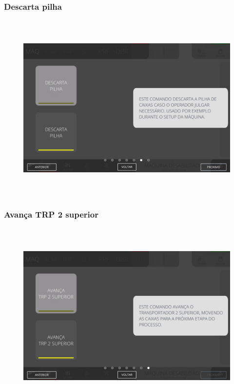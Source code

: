 \newpage
\thispagestyle{fancy}
\vspace*{40 pt}
\subsubsection{\small{Descarta pilha}}
\vspace*{\fill}
\begin{figure}[h]
  \centering
  \includegraphics[width=576px,height=360px]{src/imagesFlexo/08-count/commands/e-6.png}
\end{figure}
\vspace*{\fill}

\newpage
\thispagestyle{fancy}
\vspace*{40 pt}
\subsubsection{\small{Avança TRP 2 superior}}
\vspace*{\fill}
\begin{figure}[h]
  \centering
  \includegraphics[width=576px,height=360px]{src/imagesFlexo/08-count/commands/e-7.png}
\end{figure}
\vspace*{\fill}


